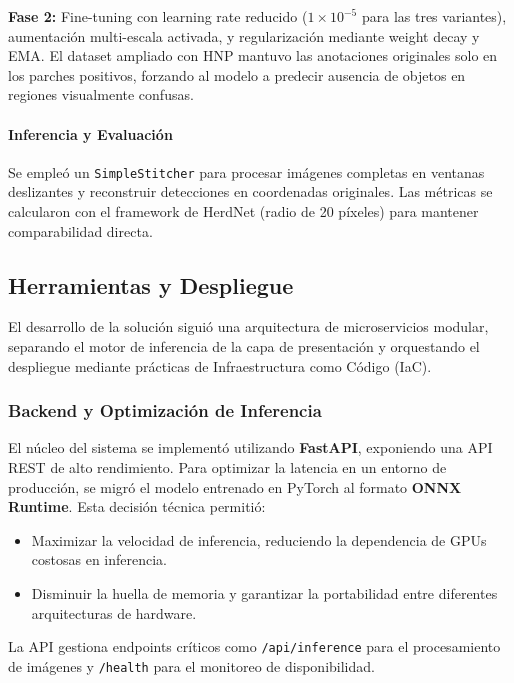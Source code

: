 \textbf{Fase 2:} Fine-tuning con learning rate reducido ($1 \times 10^{-5}$ para las tres variantes), aumentación multi-escala activada, y regularización mediante weight decay y EMA. El dataset ampliado con HNP mantuvo las anotaciones originales solo en los parches positivos, forzando al modelo a predecir ausencia de objetos en regiones visualmente confusas.


\paragraph{Inferencia y Evaluación}
Se empleó un \texttt{SimpleStitcher} para procesar imágenes completas en ventanas deslizantes y reconstruir detecciones en coordenadas originales. Las métricas se calcularon con el framework de HerdNet (radio de 20 píxeles) para mantener comparabilidad directa.

\subsection{Herramientas y Despliegue}

El desarrollo de la solución siguió una arquitectura de microservicios modular, separando el motor de inferencia de la capa de presentación y orquestando el despliegue mediante prácticas de Infraestructura como Código (IaC).

\subsubsection{Backend y Optimización de Inferencia}
El núcleo del sistema se implementó utilizando \textbf{FastAPI}, exponiendo una API REST de alto rendimiento. Para optimizar la latencia en un entorno de producción, se migró el modelo entrenado en PyTorch al formato \textbf{ONNX Runtime}. Esta decisión técnica permitió:
\begin{itemize}
    \item Maximizar la velocidad de inferencia, reduciendo la dependencia de GPUs costosas en inferencia.
    \item Disminuir la huella de memoria y garantizar la portabilidad entre diferentes arquitecturas de hardware.
\end{itemize}
La API gestiona endpoints críticos como \texttt{/api/inference} para el procesamiento de imágenes y \texttt{/health} para el monitoreo de disponibilidad.

